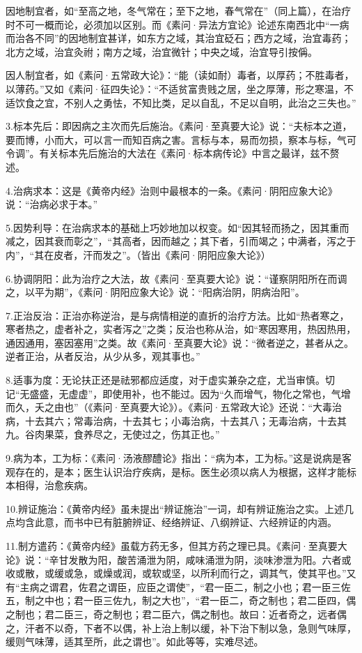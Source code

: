 \documentclass[a4paper,12pt,UTF8,twoside]{ctexbook}
\begin{document}
	因地制宜者，如“至高之地，冬气常在；至下之地，春气常在”（同上篇），在治疗时不可一概而论，必须加以区别。而《素问·异法方宜论》论述东南西北中“一病而治各不同”的因地制宜甚详，如东方之域，其治宜砭石；西方之域，治宜毒药；北方之域，治宜灸祔；南方之域，治宜微针；中央之域，治宜导引按偁。
	
	因人制宜者，如《素问·五常政大论》：“能（读如耐）毒者，以厚药；不胜毒者，以薄药。”又如《素问·征四失论》：“不适贫富贵贱之居，坐之厚薄，形之寒温，不适饮食之宜，不别人之勇怯，不知比类，足以自乱，不足以自明，此治之三失也。”
	
	3.标本先后：即因病之主次而先后施治。《素问·至真要大论》说：“夫标本之道，要而博，小而大，可以言一而知百病之害。言标与本，易而勿损，察本与标，气可令调”。有关标本先后施治的大法在《素问·标本病传论》中言之最详，兹不赘述。
	
	4.治病求本：这是《黄帝内经》治则中最根本的一条。《素问·阴阳应象大论》说：“治病必求于本。”
	
	5.因势利导：在治病求本的基础上巧妙地加以权变。如“因其轻而扬之，因其重而减之，因其衰而彰之”，“其高者，因而越之；其下者，引而竭之；中满者，泻之于内”，“其在皮者，汗而发之”。（皆出《素问·阴阳应象大论》）
	
	6.协调阴阳：此为治疗之大法，故《素问·至真要大论》说：“谨察阴阳所在而调之，以平为期”，《素问·阴阳应象大论》说：“阳病治阴，阴病治阳”。
	
	7.正治反治：正治亦称逆治，是与病情相逆的直折的治疗方法。比如“热者寒之，寒者热之，虚者补之，实者泻之”之类；反治也称从治，如“寒因寒用，热因热用，通因通用，塞因塞用”之类。故《素问·至真要大论》说：“微者逆之，甚者从之。逆者正治，从者反治，从少从多，观其事也。”
	
	8.适事为度：无论扶正还是祛邪都应适度，对于虚实兼杂之症，尤当审慎。切记“无盛盛，无虚虚”，即使用补，也不能过。因为“久而增气，物化之常也，气增而久，夭之由也”（《素问·至真要大论》）。《素问·五常政大论》还说：“大毒治病，十去其六；常毒治病，十去其七；小毒治病，十去其八；无毒治病，十去其九。谷肉果菜，食养尽之，无使过之，伤其正也。”
	
	9.病为本，工为标：《素问·汤液醪醴论》指出：“病为本，工为标。”这是说病是客观存在的，是本；医生认识治疗疾病，是标。医生必须以病人为根据，这样才能标本相得，治愈疾病。
	
	10.辨证施治：《黄帝内经》虽未提出“辨证施治”一词，却有辨证施治之实。上述几点均含此意，而书中已有脏腑辨证、经络辨证、八纲辨证、六经辨证的内涵。
	
	11.制方遣药：《黄帝内经》虽载方药无多，但其方药之理已具。《素问·至真要大论》说：“辛甘发散为阳，酸苦涌泄为阴，咸味涌泄为阴，淡味渗泄为阳。六者或收或散，或缓或急，或燥或润，或软或坚，以所利而行之，调其气，使其平也。”又有“主病之谓君，佐君之谓臣，应臣之谓使”，“君一臣二，制之小也；君一臣三佐五，制之中也；君一臣三佐九，制之大也”，“君一臣二，奇之制也；君二臣四，偶之制也；君二臣三，奇之制也；君二臣六，偶之制也。故曰：近者奇之，远者偶之，汗者不以奇，下者不以偶，补上治上制以缓，补下治下制以急，急则气味厚，缓则气味薄，适其至所，此之谓也”。如此等等，实难尽述。
	
\end{document}
